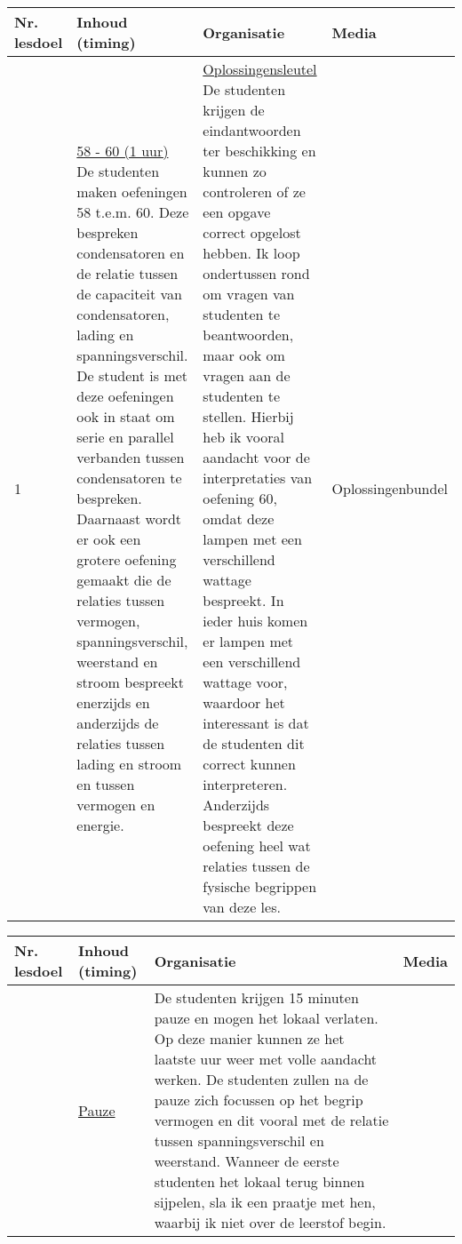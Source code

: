 \begin{landscape}
	
	\begin{tabularx}{1.56\textwidth}{|p{1.5cm}|p{6cm}|X|p{4cm}|}
		\hline
		\textbf{Nr. lesdoel } & \textbf{Inhoud (timing)}  & \textbf{Organisatie } & \textbf{Media } \\ \hline
		1\newline 2\newline 3\newline 8&\underline{58 - 60 (1 uur)}
	    De studenten maken oefeningen 58 t.e.m. 60. Deze bespreken condensatoren en de relatie tussen de capaciteit van condensatoren, lading en spanningsverschil. De student is met deze oefeningen ook in staat om serie en parallel verbanden tussen condensatoren te bespreken. Daarnaast wordt er ook een grotere oefening gemaakt die de relaties tussen vermogen, spanningsverschil, weerstand en stroom bespreekt enerzijds en anderzijds de relaties tussen lading en stroom en tussen vermogen en energie.
	    &  \underline{Oplossingensleutel}
	    	De studenten krijgen de eindantwoorden ter beschikking en kunnen zo controleren of ze een opgave correct opgelost hebben. Ik loop ondertussen rond om vragen van studenten te beantwoorden, maar ook om vragen aan de studenten te stellen. Hierbij heb ik vooral aandacht voor de interpretaties van oefening 60, omdat deze lampen met een verschillend wattage bespreekt. In ieder huis komen er lampen met een verschillend wattage voor, waardoor het interessant is dat de studenten dit correct kunnen interpreteren. Anderzijds bespreekt deze oefening heel wat relaties tussen de fysische begrippen van deze les. 
	    
		& Oplossingenbundel
		\\ \hline
	\end{tabularx}
	
	
	
	\begin{tabularx}{1.56\textwidth}{|p{1.5cm}|p{6cm}|X|p{4cm}|}
		\hline
		\textbf{Nr. lesdoel } & \textbf{Inhoud (timing)}  & \textbf{Organisatie } & \textbf{Media } \\ \hline
		&\underline{Pauze}\newline
		
		
		&    De studenten krijgen 15 minuten pauze en mogen het lokaal verlaten. Op deze manier kunnen ze het laatste uur weer met volle aandacht werken. De studenten zullen na de pauze zich focussen op het begrip vermogen en dit vooral met de relatie tussen spanningsverschil en weerstand. \newline
		Wanneer de eerste studenten het lokaal terug binnen sijpelen, sla ik een praatje met hen, waarbij ik niet over de leerstof begin. 
		& 
		\\ \hline
	\end{tabularx}
	

\end{landscape}
